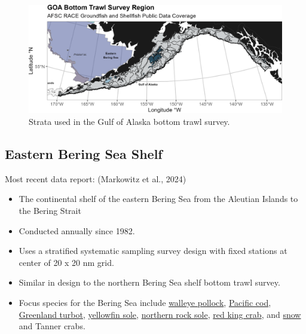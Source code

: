 \documentclass[
  letterpaper,
  oneside,
  open=any]{scrbook}
\providecommand{\tightlist}{%
  \setlength{\itemsep}{0pt}\setlength{\parskip}{0pt}}\usepackage{longtable,booktabs,array}
\begin{document}
\begin{figure}[H]

{\centering \includegraphics[width=7in,height=\textheight]{content/../img/survey_plot_goa.png}

}

\caption{Strata used in the Gulf of Alaska bottom trawl survey.}

\end{figure}%

\subsection{\texorpdfstring{\textbf{Eastern Bering Sea
Shelf}}{Eastern Bering Sea Shelf}}\label{eastern-bering-sea-shelf}

Most recent data report: (Markowitz et al., 2024)

\begin{itemize}
\tightlist
\item
  The continental shelf of the eastern Bering Sea from the Aleutian
  Islands to the Bering Strait
\item
  Conducted annually since 1982.
\item
  Uses a stratified systematic sampling survey design with fixed
  stations at center of 20 x 20 nm grid.
\item
  Similar in design to the northern Bering Sea shelf bottom trawl
  survey.
\item
  Focus species for the Bering Sea include
  \href{https://www.fisheries.noaa.gov/species/alaska-pollock}{walleye
  pollock},
  \href{https://www.fisheries.noaa.gov/species/pacific-cod}{Pacific
  cod},
  \href{https://www.fisheries.noaa.gov/species/greenland-turbot}{Greenland
  turbot},
  \href{https://www.fisheries.noaa.gov/species/yellowfin-sole}{yellowfin
  sole},
  \href{https://www.fisheries.noaa.gov/species/rock-sole}{northern rock
  sole}, \href{https://www.fisheries.noaa.gov/species/red-king-crab}{red
  king crab}, and
  \href{https://www.fisheries.noaa.gov/species/alaska-snow-crab}{snow}
  and Tanner crabs.
\end{itemize}
\end{document}
